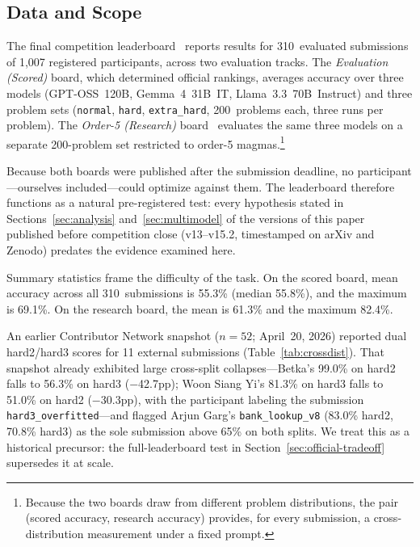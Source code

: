 \documentclass[11pt]{article}
\begin{document}
\subsection{Data and Scope}
\label{sec:official-data}

The final competition leaderboard~\citep{sair2026leaderboard} reports
results for 310~evaluated submissions of 1{,}007 registered participants,
across two evaluation tracks. The \emph{Evaluation (Scored)} board, which
determined official rankings, averages accuracy over three models
(GPT-OSS~120B, Gemma~4~31B~IT, Llama~3.3~70B~Instruct) and three problem
sets (\texttt{normal}, \texttt{hard}, \texttt{extra\_hard}, 200~problems
each, three runs per problem). The \emph{Order-5 (Research)}
board~\citep{sair2026leaderboardresearch} evaluates the same three models
on a separate 200-problem set restricted to order-5
magmas.\footnote{Because the two boards draw from different problem
distributions, the pair (scored accuracy, research accuracy) provides,
for every submission, a cross-distribution measurement under a fixed
prompt.}

Because both boards were published after the submission deadline, no
participant---ourselves included---could optimize against them. The
leaderboard therefore functions as a natural pre-registered test: every
hypothesis stated in Sections~\ref{sec:analysis}
and~\ref{sec:multimodel} of the versions of this paper published before
competition close (v13--v15.2, timestamped on arXiv and Zenodo) predates
the evidence examined here.

Summary statistics frame the difficulty of the task. On the scored
board, mean accuracy across all 310~submissions is 55.3\% (median
55.8\%), and the maximum is 69.1\%. On the research board, the mean is
61.3\% and the maximum 82.4\%.

An earlier Contributor Network snapshot ($n{=}52$; April~20, 2026)
reported dual hard2/hard3 scores for 11 external submissions
(Table~\ref{tab:crossdist}). That snapshot already exhibited large
cross-split collapses---Betka's 99.0\% on hard2 falls to 56.3\% on
hard3 ($-$42.7pp); Woon Siang Yi's 81.3\% on hard3 falls to 51.0\% on
hard2 ($-$30.3pp), with the participant labeling the submission
\texttt{hard3\_overfitted}---and flagged Arjun Garg's
\texttt{bank\_lookup\_v8} (83.0\% hard2, 70.8\% hard3) as the sole
submission above 65\% on both splits. We treat this as a historical
precursor: the full-leaderboard test in
Section~\ref{sec:official-tradeoff} supersedes it at scale.
\end{document}

